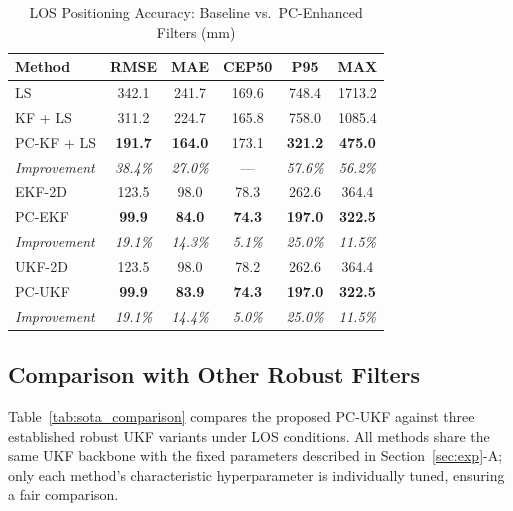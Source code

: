 \documentclass[journal]{IEEEtran}
\begin{document}
\begin{table}[t]
\centering
\caption{LOS Positioning Accuracy: Baseline vs.\ PC-Enhanced Filters (mm)}
\label{tab:pc_comparison}
\renewcommand{\arraystretch}{1.15}
\begin{tabular}{@{}lccccc@{}}
\toprule
\textbf{Method} & \textbf{RMSE} & \textbf{MAE} & \textbf{CEP50} & \textbf{P95} & \textbf{MAX} \\
\midrule
LS         & 342.1 & 241.7 & 169.6 & 748.4 & 1713.2 \\
\midrule
KF + LS          & 311.2 & 224.7 & 165.8 & 758.0 & 1085.4 \\
PC-KF + LS       & \textbf{191.7} & \textbf{164.0} & 173.1 & \textbf{321.2} & \textbf{475.0} \\
\emph{Improvement} & \emph{38.4\%} & \emph{27.0\%} & --- & \emph{57.6\%} & \emph{56.2\%} \\
\midrule
EKF-2D           & 123.5 &  98.0 &  78.3 & 262.6 & 364.4 \\
PC-EKF           & \textbf{99.9} & \textbf{84.0} & \textbf{74.3} & \textbf{197.0} & \textbf{322.5} \\
\emph{Improvement} & \emph{19.1\%} & \emph{14.3\%} & \emph{5.1\%} & \emph{25.0\%} & \emph{11.5\%} \\
\midrule
UKF-2D           & 123.5 &  98.0 &  78.2 & 262.6 & 364.4 \\
PC-UKF           & \textbf{99.9} & \textbf{83.9} & \textbf{74.3} & \textbf{197.0} & \textbf{322.5} \\
\emph{Improvement} & \emph{19.1\%} & \emph{14.4\%} & \emph{5.0\%} & \emph{25.0\%} & \emph{11.5\%} \\
\bottomrule
\end{tabular}
\end{table}

\subsection{Comparison with Other Robust Filters}

Table~\ref{tab:sota_comparison} compares the proposed PC-UKF against three established robust UKF variants under LOS conditions. All methods share the same UKF backbone with the fixed parameters described in Section~\ref{sec:exp}-A; only each method's characteristic hyperparameter is individually tuned, ensuring a fair comparison.
\end{document}
